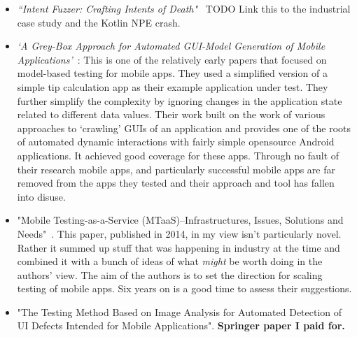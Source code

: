 \begin{itemize}
    \item \emph{``Intent Fuzzer: Crafting Intents of Death"}~\citep{10.1145/2632168.2632169} TODO Link this to the industrial case study and the Kotlin NPE crash.
    
    \item \emph{`A Grey-Box Approach for Automated GUI-Model Generation of Mobile Applications'}~\citep{Yang_Prasad_Xie_2013_grey_box_automated_gui_model_generation_for_mobile_apps}: This is one of the relatively early papers that focused on model-based testing for mobile apps. They used a simplified version of a simple tip calculation app as their example application under test. They further simplify the complexity by ignoring changes in the application state related to different data values. Their work built on the work of various approaches to `crawling' GUIs of an application and provides one of the roots of automated dynamic interactions with fairly simple opensource Android applications. It achieved good coverage for these apps. Through no fault of their research mobile apps, and particularly successful mobile apps are far removed from the apps they tested and their approach and tool has fallen into disuse. %
    
    \item "Mobile Testing-as-a-Service (MTaaS)--Infrastructures, Issues, Solutions and Needs"~\cite{gao2014mobile}. This paper, published in 2014, in my view isn't particularly novel. Rather it summed up stuff that was happening in industry at the time and combined it with a bunch of ideas of what \emph{might} be worth doing in the authors' view. The aim of the authors is to set the direction for scaling testing of mobile apps. Six years on is a good time to assess their suggestions.
    
    \item "The Testing Method Based on Image Analysis for Automated Detection of UI Defects Intended for Mobile Applications". \textbf{Springer paper I paid for.}
    

\end{itemize}
